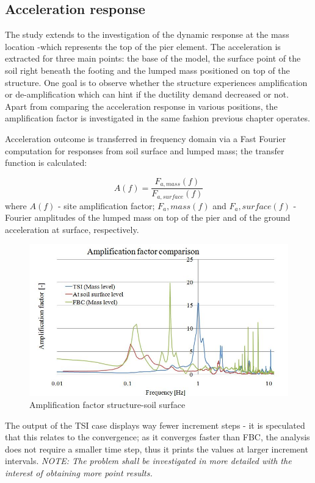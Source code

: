\newpage
\subsection{Acceleration response}
The study extends to the investigation of the dynamic response at the mass location -which represents the top of the pier element. The acceleration is extracted for three main points: the base of the model, the surface point of the soil right beneath the footing and the lumped mass positioned on top of the structure. One goal is to observe whether the structure experiences amplification or de-amplification which can hint if the ductility demand decreased or not. Apart from comparing the acceleration response in various positions, the amplification factor is investigated in the same fashion previous chapter operates.

Acceleration outcome is transferred in frequency domain via a Fast Fourier computation for responses from soil surface and lumped mass; the transfer function is calculated:

	\begin{equation}
	A(f)=\frac{F_{a,mass}(f)}{F_{a,surface}(f)}
	\end{equation}
	where $A(f)$ - site amplification factor; $F_a,mass(f)$ and $F_a,surface(f)$ - Fourier amplitudes of the lumped mass on top of the pier and of the ground acceleration at surface, respectively. 

\begin{figure}[!h]
	\centering
	\includegraphics[width=0.7\linewidth]{"amplification"}
	\caption{Amplification factor structure-soil surface}
	\label{ampli}
\end{figure}

The output of the TSI case displays way fewer increment steps - it is speculated that this relates to the convergence; as it converges faster than FBC, the analysis does not require a smaller time step, thus it prints the values at larger increment intervals. \textit{NOTE: The problem shall be investigated in more detailed with the interest of obtaining more point results.}

